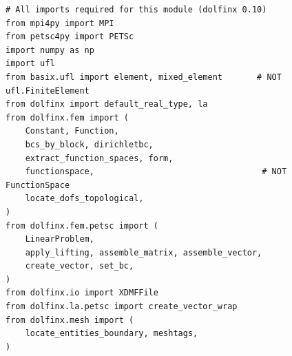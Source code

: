 \documentclass[11pt]{article}
\begin{document}
\begin{lstlisting}
# All imports required for this module (dolfinx 0.10)
from mpi4py import MPI
from petsc4py import PETSc
import numpy as np
import ufl
from basix.ufl import element, mixed_element       # NOT ufl.FiniteElement
from dolfinx import default_real_type, la
from dolfinx.fem import (
    Constant, Function,
    bcs_by_block, dirichletbc,
    extract_function_spaces, form,
    functionspace,                                  # NOT FunctionSpace
    locate_dofs_topological,
)
from dolfinx.fem.petsc import (
    LinearProblem,
    apply_lifting, assemble_matrix, assemble_vector,
    create_vector, set_bc,
)
from dolfinx.io import XDMFFile
from dolfinx.la.petsc import create_vector_wrap
from dolfinx.mesh import (
    locate_entities_boundary, meshtags,
)
\end{lstlisting}
\end{document}
